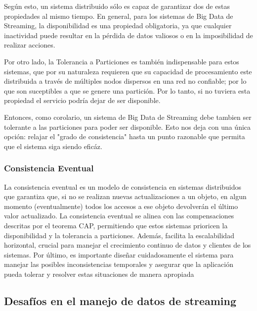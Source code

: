 Según esto, un sistema distribuido sólo es capaz de garantizar dos de estas propiedades al mismo tiempo. 
En general, para los sistemas de Big Data de Streaming, la disponibilidad es una propiedad obligatoria, ya que cualquier inactividad puede 
resultar en la pérdida de datos valiosos o en la imposibilidad de realizar acciones.

Por otro lado, la Tolerancia a Particiones es también indispensable para estos sistemas, que por su naturaleza requieren que su capacidad de 
procesamiento este distribuida a través de múltiples nodos dispersos en una red no confiable; por lo que son suceptibles 
a que se genere una partición. Por lo tanto, si no tuviera esta propiedad el servicio podría dejar de ser disponible. 

Entonces, como corolario, un sistema de Big Data de Streaming debe tambien ser tolerante a las particiones para poder ser disponible.
Esto nos deja con una única opción: relajar el "grado de consistencia" hasta un punto razonable que permita que el sistema siga siendo eficáz.\parencite{capteo}
\newpage
\subsubsection{Consistencia Eventual}
La consistencia eventual es un modelo de consistencia en sistemas distribuidos que garantiza que, 
si no se realizan nuevas actualizaciones a un objeto, en algun momento (eventualmente) todos los accesos a ese objeto 
devolverán el último valor actualizado.  
La consistencia eventual se alinea con las compensaciones descritas por el teorema CAP, 
permitiendo que estos sistemas prioricen la disponibilidad y la tolerancia a particiones. 
Además, facilita la escalabilidad horizontal, crucial para manejar el crecimiento continuo de datos y clientes de los sistemas.
Por último, es importante diseñar cuidadosamente el sistema para manejar las posibles inconsistencias temporales 
y asegurar que la aplicación pueda tolerar y resolver estas situaciones de manera apropiada \parencite{capteo}

\subsection{Desafíos en el manejo de datos de streaming}

